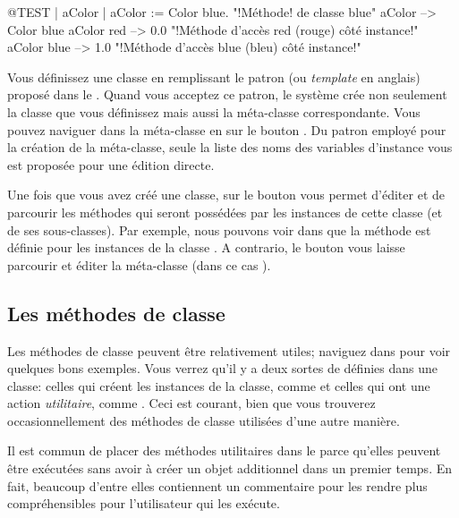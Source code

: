 \documentclass[a4paper,10pt,twoside]{book}
\begin{document}
\begin{code}{@TEST | aColor |}
aColor := Color blue.               "!Méthode! de classe blue"
aColor        --> Color blue
aColor red  --> 0.0         "!Méthode d'accès red (rouge) côté instance!"
aColor blue --> 1.0        "!Méthode d'accès blue (bleu) côté instance!"
\end{code}

Vous définissez une classe en remplissant le patron (ou \emph{template} en anglais) proposé
dans le .
Quand vous acceptez ce patron, le système crée non seulement la classe
que vous définissez mais aussi la méta-classe correspondante.
Vous pouvez naviguer dans la méta-classe en \clickant{} sur le bouton .
Du patron employé pour la création de la méta-classe, seule la
liste des noms des variables d'instance vous est proposée pour une édition directe.  

Une fois que vous avez créé une classe, \click{} sur
le bouton  vous permet d'éditer et de parcourir les
méthodes qui seront possédées par les instances de cette classe (et de ses sous-classes). Par exemple, nous pouvons voir dans  que 
la méthode  est définie pour les instances de la classe .
A contrario, le bouton  vous laisse parcourir et éditer
la méta-classe (dans ce cas ).

\subsection{Les méthodes de classe} 

Les méthodes de classe peuvent être relativement utiles; naviguez dans  pour voir quelques bons exemples.
Vous verrez qu'il y a deux sortes de  définies dans une classe: celles qui créent les instances de la classe, comme  et celles qui ont une action \emph{utilitaire}, 
comme .
Ceci est courant, bien que vous trouverez occasionnellement des méthodes de classe utilisées d'une autre manière.

Il est commun de placer des méthodes utilitaires dans le  parce qu'elles peuvent être exécutées
sans avoir à créer un objet additionnel dans un premier temps. 
En fait, beaucoup d'entre elles contiennent un commentaire pour les rendre plus compréhensibles pour l'utilisateur qui les exécute.
\end{document}
